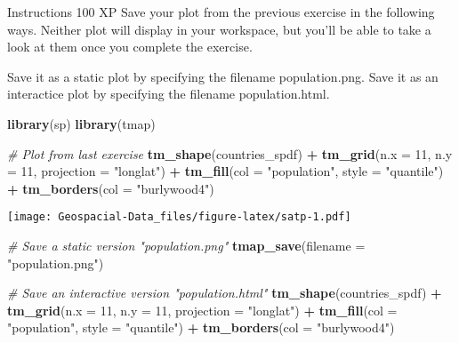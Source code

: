 \documentclass[]{article}
\newenvironment{Shaded}{\begin{snugshade}}{\end{snugshade}}
\newcommand{\CommentTok}[1]{\textcolor[rgb]{0.56,0.35,0.01}{\textit{#1}}}
\newcommand{\DataTypeTok}[1]{\textcolor[rgb]{0.13,0.29,0.53}{#1}}
\newcommand{\DecValTok}[1]{\textcolor[rgb]{0.00,0.00,0.81}{#1}}
\newcommand{\KeywordTok}[1]{\textcolor[rgb]{0.13,0.29,0.53}{\textbf{#1}}}
\newcommand{\NormalTok}[1]{#1}
\newcommand{\OperatorTok}[1]{\textcolor[rgb]{0.81,0.36,0.00}{\textbf{#1}}}
\newcommand{\StringTok}[1]{\textcolor[rgb]{0.31,0.60,0.02}{#1}}
\begin{document}
Instructions 100 XP Save your plot from the previous exercise in the
following ways. Neither plot will display in your workspace, but you'll
be able to take a look at them once you complete the exercise.

Save it as a static plot by specifying the filename population.png. Save
it as an interactice plot by specifying the filename population.html.

\begin{Shaded}
\begin{Highlighting}[]
\KeywordTok{library}\NormalTok{(sp)}
\KeywordTok{library}\NormalTok{(tmap)}

\CommentTok{# Plot from last exercise}
\KeywordTok{tm_shape}\NormalTok{(countries_spdf) }\OperatorTok{+}
\StringTok{  }\KeywordTok{tm_grid}\NormalTok{(}\DataTypeTok{n.x =} \DecValTok{11}\NormalTok{, }\DataTypeTok{n.y =} \DecValTok{11}\NormalTok{, }\DataTypeTok{projection =} \StringTok{"longlat"}\NormalTok{) }\OperatorTok{+}
\StringTok{  }\KeywordTok{tm_fill}\NormalTok{(}\DataTypeTok{col =} \StringTok{"population"}\NormalTok{, }\DataTypeTok{style =} \StringTok{"quantile"}\NormalTok{)  }\OperatorTok{+}
\StringTok{  }\KeywordTok{tm_borders}\NormalTok{(}\DataTypeTok{col =} \StringTok{"burlywood4"}\NormalTok{)}
\end{Highlighting}
\end{Shaded}

\texttt{[image: Geospacial-Data\_files/figure-latex/satp-1.pdf]}

\begin{Shaded}
\begin{Highlighting}[]
\CommentTok{# Save a static version "population.png"}
\KeywordTok{tmap_save}\NormalTok{(}\DataTypeTok{filename =} \StringTok{"population.png"}\NormalTok{)}

\CommentTok{# Save an interactive version "population.html"}
\KeywordTok{tm_shape}\NormalTok{(countries_spdf) }\OperatorTok{+}
\StringTok{  }\KeywordTok{tm_grid}\NormalTok{(}\DataTypeTok{n.x =} \DecValTok{11}\NormalTok{, }\DataTypeTok{n.y =} \DecValTok{11}\NormalTok{, }\DataTypeTok{projection =} \StringTok{"longlat"}\NormalTok{) }\OperatorTok{+}
\StringTok{  }\KeywordTok{tm_fill}\NormalTok{(}\DataTypeTok{col =} \StringTok{"population"}\NormalTok{, }\DataTypeTok{style =} \StringTok{"quantile"}\NormalTok{)  }\OperatorTok{+}
\StringTok{  }\KeywordTok{tm_borders}\NormalTok{(}\DataTypeTok{col =} \StringTok{"burlywood4"}\NormalTok{)}
\end{Highlighting}
\end{Shaded}
\end{document}
